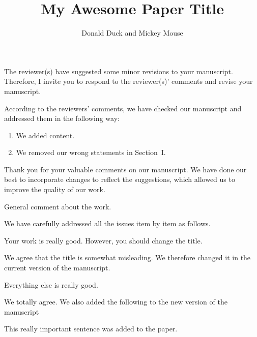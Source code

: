 \documentclass[12pt,english]{reviewresponse}
\title{My Awesome Paper Title}
\author{Donald Duck\affil{1,*} and Mickey Mouse\affil{2}}
\affiliation{1}{Department of Quacking, Duck University, Duckburg, USA}
\affiliation{2}{Department of Mousing, Mouse University, Mouseton, USA}
\begin{document}
\maketitle



\editor
\begin{generalcomment}
	The reviewer(s) have suggested some minor revisions to your manuscript. Therefore, I invite you to respond to the reviewer(s)' comments and revise your manuscript.
\end{generalcomment}
\begin{revresponse}
	According to the reviewers' comments, we have checked our manuscript and addressed them in the following way:
	\begin{enumerate}
		\item We added content.
		\item We removed our wrong statements in Section~I.
	\end{enumerate}
\end{revresponse}
\begin{concludingresponse}
	Thank you for your valuable comments on our manuscript. 
	We have done our best to incorporate changes to reflect the suggestions, which allowed us to improve the quality of our work.
\end{concludingresponse}


\reviewer
\begin{generalcomment}
	General comment about the work.
\end{generalcomment}
\begin{revresponse}
	We have carefully addressed all the issues item by item as follows.
\end{revresponse}

\begin{revcomment}
	Your work is really good. However, you should change the title.
\end{revcomment}
\begin{revresponse}
	We agree that the title is somewhat misleading.
	We therefore changed it in the current version of the manuscript.
\end{revresponse}

\begin{revcomment}
	Everything else is really good.
\end{revcomment}
\begin{revresponse}
	We totally agree. We also added the following to the new version of the manuscript
	\begin{changes}
		This really important sentence was added to the paper.
	\end{changes}
\end{revresponse}
\end{document}
